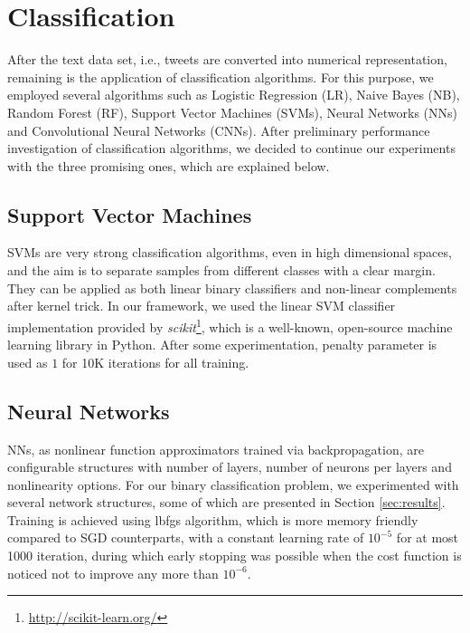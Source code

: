 \section{Classification}
\label{sec:modelSelection}
After the text data set, i.e., tweets are converted into numerical representation, remaining is the application of classification algorithms.
For this purpose, we employed several algorithms such as Logistic Regression (LR), Naive Bayes (NB), Random Forest (RF), Support Vector Machines (SVMs), Neural Networks (NNs) and Convolutional Neural Networks (CNNs).
After preliminary performance investigation of classification algorithms, we decided to continue our experiments with the three promising ones, which are explained below.

\subsection{Support Vector Machines}
SVMs are very strong classification algorithms, even in high dimensional spaces, and the aim is to separate samples from different classes with a clear margin.
They can be applied as both linear binary classifiers and non-linear complements after kernel trick.
In our framework, we used the linear SVM classifier implementation provided by \textit{scikit}\footnote{\url{http://scikit-learn.org/}}, which is a well-known, open-source machine learning library in Python.
After some experimentation, penalty parameter is used as $1$ for 10K iterations for all training.


\subsection{Neural Networks}
NNs, as nonlinear function approximators trained via backpropagation, are configurable structures with number of layers, number of neurons per layers and nonlinearity options.
For our binary classification problem, we experimented with several network structures, some of which are presented in Section \ref{sec:results}.
Training is achieved using lbfgs algorithm, which is more memory friendly compared to SGD counterparts, with a constant learning rate of $10^{-5}$ for at most 1000 iteration, during which early stopping was possible when the cost function is noticed not to improve any more than $10^{-6}$.

